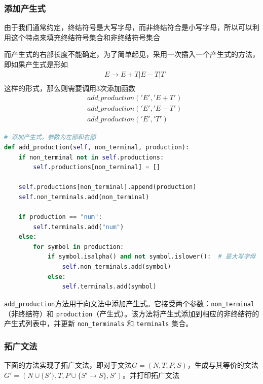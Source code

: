 \documentclass[lang=cn,11pt,a4paper]{elegantpaper}
\begin{document}
\subsubsection{添加产生式}

由于我们通常约定，终结符号是大写字母，而非终结符合是小写字母，所以可以利用这个特点来填充终结符号集合和非终结符号集合

而产生式的右部长度不能确定，为了简单起见，采用一次插入一个产生式的方法，即如果产生式是形如
$$
\begin{aligned}
& E\rightarrow E+T | E-T | T \\
\end{aligned}
$$
这样的形式，那么则需要调用3次添加函数
$$
\begin{aligned}
& add\_production('E', 'E+T') \\
& add\_production('E', 'E-T') \\
& add\_production('E', 'T')
\end{aligned}
$$

\begin{lstlisting}[language=Python]
# 添加产生式，参数为左部和右部
def add_production(self, non_terminal, production):
    if non_terminal not in self.productions:
        self.productions[non_terminal] = []

    self.productions[non_terminal].append(production)
    self.non_terminals.add(non_terminal)

    if production == "num":
        self.terminals.add("num")
    else:
        for symbol in production:
            if symbol.isalpha() and not symbol.islower():  # 是大写字母
                self.non_terminals.add(symbol)
            else:
                self.terminals.add(symbol)
\end{lstlisting}

\lstinline{add_production}方法用于向文法中添加产生式。它接受两个参数：\lstinline{non_terminal}（非终结符）和 \lstinline{production}（产生式）。该方法将产生式添加到相应的非终结符的产生式列表中，并更新 \lstinline{non_terminals} 和 \lstinline{terminals} 集合。

\subsubsection{拓广文法}

下面的方法实现了拓广文法，即对于文法$G=(N,T,P,S)$，生成与其等价的文法$G'=(N\cup \{S'\},T,P\cup\{S'\rightarrow S\},S')$。并打印拓广文法
\end{document}
